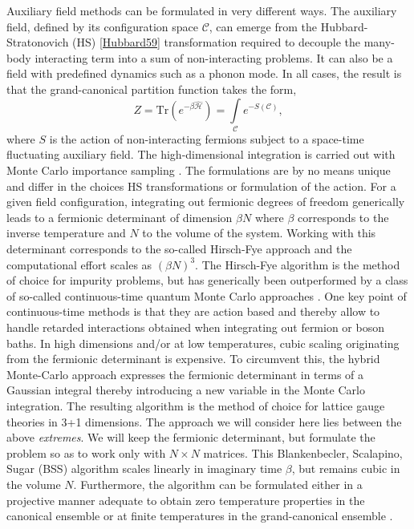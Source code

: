 Auxiliary field methods  can be formulated in very different ways.  The auxiliary field, defined by its configuration space $\mathcal{C}$,  can emerge from the Hubbard-Stratonovich (HS) \ref{Hubbard59}  transformation required to decouple the  many-body interacting term into a sum of non-interacting problems.  It can also be a field with predefined dynamics such as a phonon mode.  In all cases, the result is that  the grand-canonical partition function  takes the form, 
\begin{equation}
	 Z = \text{Tr}\left( e^{-\beta \hat{\mathcal{H}}}\right)   = \int\limits_{\mathcal{C}} e^{-S(\mathcal{C}) },
\end{equation}
where  $S$  is the action of non-interacting fermions subject to a  space-time fluctuating auxiliary field.  The high-dimensional  integration is carried out with Monte Carlo importance sampling \cite{Sokal89}.
The formulations are by no means unique and differ in the choices HS transformations or formulation of the action.  
For a given field configuration, integrating out  fermionic degrees of freedom generically leads to a fermionic determinant of dimension $\beta N$ where $\beta $  corresponds to the inverse temperature and $N$ to the volume of the system.  Working  with this determinant  corresponds to the so-called Hirsch-Fye approach \cite{HirschFye86}  and the computational effort scales as $\left( \beta N \right)^3$. The Hirsch-Fye  algorithm is the method of choice for impurity problems, but has  generically been outperformed by a class of so-called continuous-time quantum Monte Carlo approaches  
\cite{Gull_rev,Assaad14_rev, Assaad07}.    One key point of continuous-time methods  is that they are action based  and thereby allow to handle retarded interactions obtained when integrating out fermion or boson baths.  In high dimensions and/or at low temperatures, cubic scaling originating from the   fermionic determinant is expensive.   To circumvent this,  the hybrid Monte-Carlo approach  \cite{Duane87}  expresses the fermionic determinant in terms of a Gaussian integral thereby introducing a new variable in the Monte Carlo integration.    The resulting algorithm is the method of choice for lattice gauge theories in 3+1 dimensions. 
The approach we will consider here lies between the  above \textit{extremes}.  We will keep the fermionic determinant, but formulate  the problem so as to  work only with $N\times N$ matrices.    This 
Blankenbecler,  Scalapino, Sugar (BSS)  algorithm scales linearly in  imaginary time $\beta$, but remains cubic in the volume $N$.    Furthermore, the algorithm can be formulated either in a projective manner \cite{Sugiyama86,Sorella89} adequate to obtain zero temperature properties in the  canonical ensemble or at finite temperatures in the  grand-canonical ensemble \cite{White89}.

